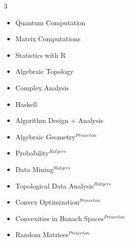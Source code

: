 \begin{multicols}{3}
\begin{itemize}
\setlength\itemsep{-0.5em}
\item Quantum Computation
\item Matrix Computations
\item Statistics with R
\item Algebraic Topology
\item Complex Analysis
\item Haskell
\item Algorithm Design + Analysis
\item Algebraic Geometry$^{Princeton}$
\item Probability$^{Rutgers}$
\item Data Mining$^{Rutgers}$
\item Topological Data Analysis$^{Rutgers}$
\item Convex Optimization$^{Princeton}$
\item Convexities in Banach Spaces$^{Princeton}$
\item Random Matrices$^{Princeton}$
\end{itemize}
\end{multicols}


\vspace{-5pt}

















